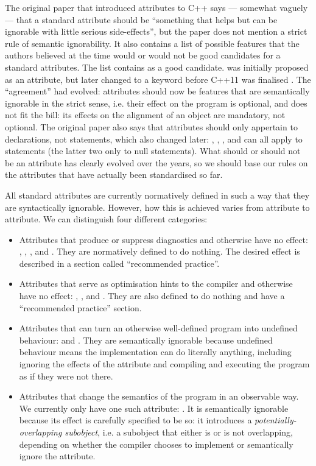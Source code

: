 The original paper that introduced attributes to C++ \cite{N2761} says --- somewhat vaguely --- that a standard attribute should be  ``something that helps but can be ignorable with little serious side-effects'', but the paper does not mention a strict rule of semantic ignorability. It also contains a list of possible features that the authors believed at the time would or would not be good candidates for a standard attributes. The list contains  as a good candidate.  was initially proposed as an attribute, but later changed to a keyword before C++11 was finalised \cite{N3190}. The ``agreement'' had evolved: attributes should now be features that are semantically ignorable in the strict sense, i.e. their effect on the program is optional, and  does not fit the bill: its effects on the alignment of an object are mandatory, not optional. The original paper also says that attributes should only appertain to declarations, not statements, which also changed later: , , , and  can all apply to statements (the latter two only to null statements). What should or should not be an attribute has clearly evolved over the years, so we should base our rules on the attributes that have actually been standardised so far.

All standard attributes are currently normatively defined in such a way that they are syntactically ignorable. However, how this is achieved varies from attribute to attribute. We can distinguish four different categories:

\begin{itemize}
\item Attributes that produce or suppress diagnostics and otherwise have no effect: , , , and . They are normatively defined to do nothing. The desired effect is described in a section called ``recommended practice''.
\item Attributes that serve as optimisation hints to the compiler and otherwise have no effect: , , and . They are also defined to do nothing and have a ``recommended practice'' section.
\item Attributes that can turn an otherwise well-defined program into undefined behaviour:  and . They are semantically ignorable because undefined behaviour means the implementation can do literally anything, including ignoring the effects of the attribute and compiling and executing the program as if they were not there.
\item Attributes that change the semantics of the program in an observable way. We currently only have one such attribute: . It is semantically ignorable because its effect is carefully specified to be so: it introduces a \emph{potentially-overlapping subobject}, i.e. a subobject that either is or is not overlapping, depending on whether the compiler chooses to implement or semantically ignore the attribute.
\end{itemize}

